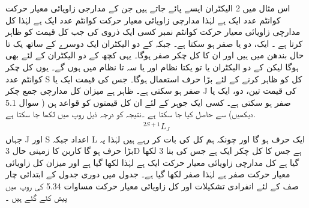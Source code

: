  اس مثال میں 2 الیکٹران ایسے پائے جاتے ہیں جن کے مدارجی زاویائی معیار حرکت کوانٹم  عدد ایک ہے لہٰذا مدارچی زاویائی معیار حرکت کوانٹم عدد ایک ہے لہٰذا کل مدارچی زاویائی معیار حرکت کوانٹم نمبر   کسی ایک ذروی کی جب   کل قیمت کو ظاہر کرتا ہے ۔ ایک، دو یا صفر ہو  سکتا ہے۔ جبکہ    کے دو   الیکٹران ایک دوسرے کے ساتھ یک تا حال  بندھن میں  ہیں اور ان کا کل چکر صفر ہوگا۔ یہی کچھ   کے دو الیکٹران کے لئے بھی ہوگا لیکن    کے دو الیکٹران یا تو یکتا نظام اور یا سہ تا نظام میں ہوں گے۔ یوں کل چکر کوانٹم عدد S کل کو ظاہر کرنے کے لئے بڑا حرف استعمال ہوگا۔ جس کی قیمت ایک یا صفر ہو سکتی ہے۔ ظاہر ہے میزان کل مدارچی جمع چکر J کی قیمت تین، دو، ایک یا صفر ہو سکتی ہے۔ کسی ایک جوہر کے لئے ان کل قیمتوں کو  قواعد  ہن ( سوال 5.1 دیکھیں)  سے حاصل کیا جا سکتا ہے ۔نتیجہ کو درجہ ذیل روپ میں لکھا جا سکتا ہے. 
 \begin{align}
 ^{2S+1}L_{J}\end{align}
  جہاں J اور S اعداد جبکہ L ایک حرف ہو گا اور چونکہ ہم کل کی بات کر رہے ہیں لہٰذا یہ بڑا حرف ہو گا کاربن کا زمینی حال  3D ہے جس کا کل چکر ایک ہے جس کی بنا 3 لکھا گیا ہے کل مدارچی زاویائی معیار حرکت ایک ہے لہٰذا
      لکھا گیا ہے اور میزان  کل زاویائی معیار حرکت صفر ہے لہٰذا صفر لکھا گیا ہے۔ جدول    میں دوری جدول کے ابتدائی چار  صف  کے لئے انفرادی  تشکیلات  اور کل زاویائی معیار حرکت مساوات 5.34 کی روپ میں پیش کئے گئے ہیں ۔ 
